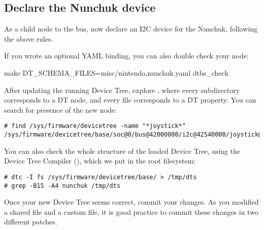 \subsection{Declare the Nunchuk device}

As a child node to the  bus, now declare an I2C device
for the Nunchuk, following the above rules.

If you wrote an optional YAML binding, you can also double check your
node:
\begin{bashinput}
make DT_SCHEMA_FILES=misc/nintendo,nunchuk.yaml dtbs_check
\end{bashinput}

After updating the running Device Tree, explore
, where every subdirectory corresponds to
a DT node, and every file corresponds to a DT property. You can search
for presence of the new  node:

{\small
\begin{verbatim}
# find /sys/firmware/devicetree -name "*joystick*"
/sys/firmware/devicetree/base/soc@0/bus@42000000/i2c@42540000/joystick@52
\end{verbatim}
}

You can also check the whole structure of the loaded Device Tree, using
the Device Tree Compiler (), which we put in the root
filesystem:
\begin{verbatim}
# dtc -I fs /sys/firmware/devicetree/base/ > /tmp/dts
# grep -B15 -A4 nunchuk /tmp/dts
\end{verbatim}

Once your new Device Tree seems correct, commit your changes. As you
modified a shared file and a custom file, it is good practice to commit
these changes in two different patches.
